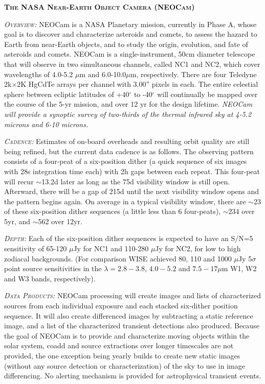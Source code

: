 \documentclass[12pt]{article}
\begin{document}
\smallskip
\smallskip
\noindent
{\bfseries \textsc{\textcolor{Cerulean}{The NASA Near-Earth Object Camera (NEOCam)}}}

\textsl{\textsc{Overview:}}
NEOCam is a NASA Planetary mission, currently in Phase A, whose goal
is to discover and characterize asteroids and comets, to assess the
hazard to Earth from near-Earth objects, and to study the origin,
evolution, and fate of asteroids and comets. NEOCam is a
single-instrument, 50cm diameter telescope that will observe in two
simultaneous channels, called NC1 and NC2, which cover wavelengths of
4.0-5.2 $\mu$m and 6.0-10.0$\mu$m, respectively. There are four Teledyne
2k$\times$2K HgCdTe arrays per channel with 3.00'' pixels in each. The entire
celestial sphere between ecliptic latitudes of +40$^{\circ}$ to -40$^{\circ}$ will
continually be mapped over the course of the 5-yr mission, and over 12
yr for the design lifetime. 
{\it NEOCam will provide a synoptic survey of two-thirds of the thermal infrared sky at 4-5.2 microns and 6-10 microns.}

\smallskip
\smallskip
\noindent
\textsl{\textsc{Cadence:}} Estimates of on-board overheads and resulting orbit quality are still being refined, but the current data cadence is as follows. The observing pattern consists of a four-peat of a six-position dither (a quick sequence of six images with 28s integration time each) with 2h gaps between each repeat. This four-peat will recur $\sim$13.2d later as long as the 75d visibility window is still open. Afterward, there will be a gap of 215d until the next visibility window opens and the pattern begins again. On average in a typical visibility window, there are $\sim$23 of these six-position dither sequences (a little less than 6 four-peats), $\sim$234 over 5yr, and $\sim$562 over 12yr.

\smallskip
\smallskip
\noindent
\textsl{\textsc{Depth:}} Each of the six-position dither sequences is expected to have an S/N=5 sensitivity of 65-120 $\mu$Jy for NC1 and 110-280 $\mu$Jy for NC2, for low to high zodiacal backgrounds. 
(For comparison WISE achieved 80, 110 and 1000 $\mu$Jy 5$\sigma$ point source sensitivities in the $\lambda=2.8-3.8$, $4.0-5.2$ and $7.5-17\mu$m W1, W2 and W3 bands, respectively).

\smallskip
\smallskip
\noindent
\textsl{\textsc{Data Products:}} NEOCam processing will create images and lists of characterized sources from each individual exposure and each stacked six-dither position sequence. It will also create differenced images by subtracting a static reference image, and a list of the characterized transient detections also produced. Because the goal of NEOCam is to provide and characterize moving objects within the solar system, coadd and source extractions over longer timescales are not provided, the one exception being yearly builds to create new static images (without any source detection or characterization) of the sky to use in image differencing. No alerting mechanism is provided for astrophysical transient events.  
\end{document}
